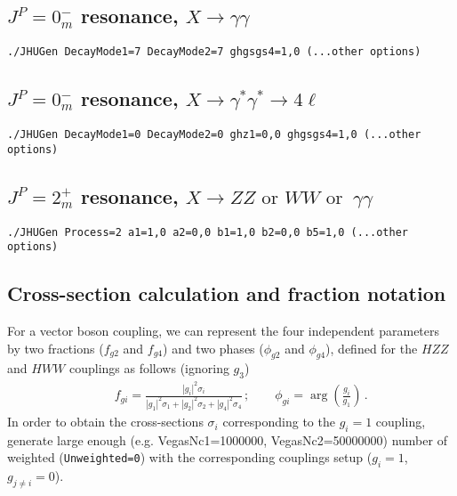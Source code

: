 \documentclass[aps,superscriptaddress,nofootinbib]{revtex4}
\begin{document}
\subsection{\texorpdfstring{$J^P = 0^-_m$ resonance, $X \to \gamma \gamma$}{JP=0-m resonance, X -> gamma gamma}}
\label{sec:exD}
\begin{verbatim}
./JHUGen DecayMode1=7 DecayMode2=7 ghgsgs4=1,0 (...other options)
\end{verbatim}
\subsection{\texorpdfstring{$J^P=0^-_m$ resonance, $X\to\gamma^*\gamma^*\to4\ell$}{JP=0-m resonance, X -> gamma* gamma* -> 4l}}
\label{sec:exE}
\begin{verbatim}
./JHUGen DecayMode1=0 DecayMode2=0 ghz1=0,0 ghgsgs4=1,0 (...other options)
\end{verbatim}
\subsection{\texorpdfstring{$J^P = 2^+_m$ resonance, $X \to ZZ\text{ or }WW\text{ or }~\gamma\gamma$}{JP=2+m resonance, X -> ZZ or WW or gamma gamma}}
\begin{verbatim}
./JHUGen Process=2 a1=1,0 a2=0,0 b1=1,0 b2=0,0 b5=1,0 (...other options)
\end{verbatim}
\subsection{Cross-section calculation and fraction notation}
For a vector boson coupling, we can represent the four independent parameters by two  fractions
($f_{g2}$ and $f_{g4}$) and two phases ($\phi_{g2}$ and $\phi_{g4}$), defined for the $HZZ$
and $HWW$ couplings as follows (ignoring $g_3$)
%
\begin{eqnarray}
&& f_{gi} =  \frac{|g^{}_{i}|^2\sigma_i}{|g^{}_{1}|^2\sigma_1+|g^{}_{2}|^2\sigma_2+|g^{}_{4}|^2\sigma_4}\,;
~~~~~~~~~
 \phi_{gi} = \arg\left(\frac{g_i}{g_1}\right)\,.
\nonumber
\label{eq:fractions}
\end{eqnarray}
%
In order to obtain the cross-sections $\sigma_i$ corresponding to the $g^{}_{i}=1$ coupling,
generate large enough (e.g. VegasNc1=1000000, VegasNc2=50000000) number of weighted
({\tt Unweighted=0}) with the corresponding couplings setup ($g^{}_{i}=1$, $g^{}_{j\ne i}=0$).
\end{document}
